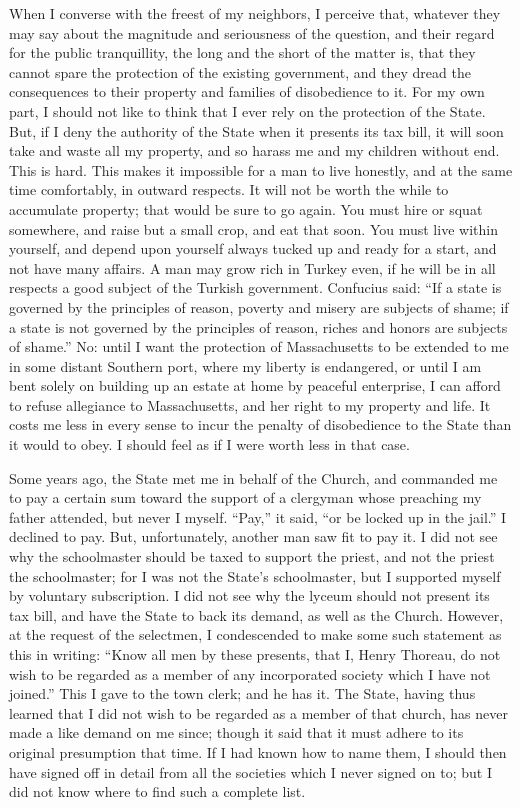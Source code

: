 \documentclass[12pt]{article}
\begin{document}
When I converse with the freest of my neighbors, I perceive that,
whatever they may say about the magnitude and seriousness of the
question, and their regard for the public tranquillity, the long and the
short of the matter is, that they cannot spare the protection of the
existing government, and they dread the consequences to their property
and families of disobedience to it. For my own part, I should not like
to think that I ever rely on the protection of the State. But, if I deny
the authority of the State when it presents its tax bill, it will soon
take and waste all my property, and so harass me and my children without
end. This is hard. This makes it impossible for a man to live honestly,
and at the same time comfortably, in outward respects. It will not be
worth the while to accumulate property; that would be sure to go again.
You must hire or squat somewhere, and raise but a small crop, and eat
that soon. You must live within yourself, and depend upon yourself
always tucked up and ready for a start, and not have many affairs. A man
may grow rich in Turkey even, if he will be in all respects a good
subject of the Turkish government. Confucius said: ``If a state is
governed by the principles of reason, poverty and misery are subjects of
shame; if a state is not governed by the principles of reason, riches
and honors are subjects of shame.'' No: until I want the protection of
Massachusetts to be extended to me in some distant Southern port, where
my liberty is endangered, or until I am bent solely on building up an
estate at home by peaceful enterprise, I can afford to refuse allegiance
to Massachusetts, and her right to my property and life. It costs me
less in every sense to incur the penalty of disobedience to the State
than it would to obey. I should feel as if I were worth less in that
case.

Some years ago, the State met me in behalf of the Church, and commanded
me to pay a certain sum toward the support of a clergyman whose
preaching my father attended, but never I myself. ``Pay,'' it said, ``or
be locked up in the jail.'' I declined to pay. But, unfortunately,
another man saw fit to pay it. I did not see why the schoolmaster should
be taxed to support the priest, and not the priest the schoolmaster; for
I was not the State's schoolmaster, but I supported myself by voluntary
subscription. I did not see why the lyceum should not present its tax
bill, and have the State to back its demand, as well as the Church.
However, at the request of the selectmen, I condescended to make some
such statement as this in writing: ``Know all men by these presents,
that I, Henry Thoreau, do not wish to be regarded as a member of any
incorporated society which I have not joined.'' This I gave to the town
clerk; and he has it. The State, having thus learned that I did not wish
to be regarded as a member of that church, has never made a like demand
on me since; though it said that it must adhere to its original
presumption that time. If I had known how to name them, I should then
have signed off in detail from all the societies which I never signed on
to; but I did not know where to find such a complete list.
\end{document}
